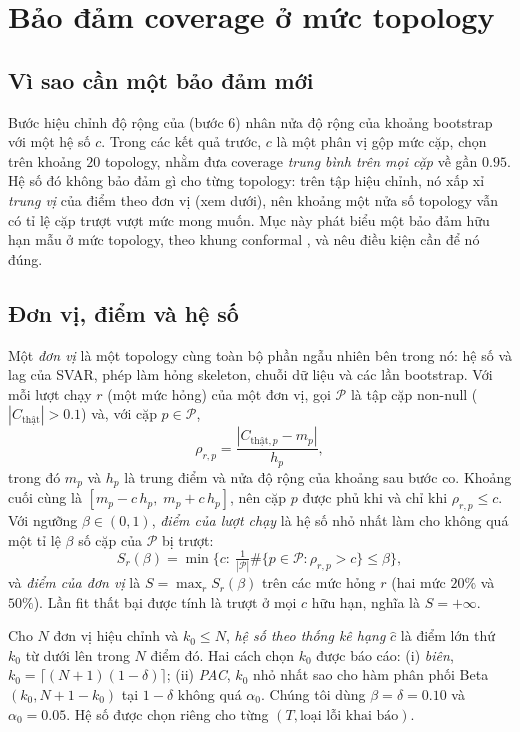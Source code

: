 \section{Bảo đảm coverage ở mức topology}\label{sec:bao-dam}

\subsection{Vì sao cần một bảo đảm mới}
Bước hiệu chỉnh độ rộng của \ours{} (bước 6) nhân nửa độ rộng của khoảng bootstrap với một hệ số $c$. Trong các kết quả trước, $c$ là một phân vị gộp mức cặp, chọn trên khoảng $20$ topology, nhằm đưa coverage \emph{trung bình trên mọi cặp} về gần $0.95$. Hệ số đó không bảo đảm gì cho từng topology: trên tập hiệu chỉnh, nó xấp xỉ \emph{trung vị} của điểm theo đơn vị (xem dưới), nên khoảng một nửa số topology vẫn có tỉ lệ cặp trượt vượt mức mong muốn. Mục này phát biểu một bảo đảm hữu hạn mẫu ở mức topology, theo khung conformal \citep{barber2023conformal,dunn2023distribution}, và nêu điều kiện cần để nó đúng.

\subsection{Đơn vị, điểm và hệ số}
Một \emph{đơn vị} là một topology cùng toàn bộ phần ngẫu nhiên bên trong nó: hệ số và lag của SVAR, phép làm hỏng skeleton, chuỗi dữ liệu và các lần bootstrap. Với mỗi lượt chạy $r$ (một mức hỏng) của một đơn vị, gọi $\mathcal P$ là tập cặp non-null ($|C_{\text{thật}}|>0.1$) và, với cặp $p\in\mathcal P$,
\begin{equation}
\rho_{r,p}=\frac{|C_{\text{thật},p}-m_p|}{h_p},
\end{equation}
trong đó $m_p$ và $h_p$ là trung điểm và nửa độ rộng của khoảng sau bước co. Khoảng cuối cùng là $[m_p-c\,h_p,\;m_p+c\,h_p]$, nên cặp $p$ được phủ khi và chỉ khi $\rho_{r,p}\le c$. Với ngưỡng $\beta\in(0,1)$, \emph{điểm của lượt chạy} là hệ số nhỏ nhất làm cho không quá một tỉ lệ $\beta$ số cặp của $\mathcal P$ bị trượt:
\begin{equation}
S_r(\beta)=\min\{c:\ \tfrac1{|\mathcal P|}\#\{p\in\mathcal P:\rho_{r,p}>c\}\le\beta\},
\end{equation}
và \emph{điểm của đơn vị} là $S=\max_r S_r(\beta)$ trên các mức hỏng $r$ (hai mức $20\%$ và $50\%$). Lần fit thất bại được tính là trượt ở mọi $c$ hữu hạn, nghĩa là $S=+\infty$.

Cho $N$ đơn vị hiệu chỉnh và $k_0\le N$, \emph{hệ số theo thống kê hạng} $\hat c$ là điểm lớn thứ $k_0$ từ dưới lên trong $N$ điểm đó. Hai cách chọn $k_0$ được báo cáo: (i) \emph{biên}, $k_0=\lceil(N+1)(1-\delta)\rceil$; (ii) \emph{PAC}, $k_0$ nhỏ nhất sao cho hàm phân phối Beta$(k_0,N+1-k_0)$ tại $1-\delta$ không quá $\alpha_0$. Chúng tôi dùng $\beta=\delta=0.10$ và $\alpha_0=0.05$. Hệ số được chọn riêng cho từng $(T,\text{loại lỗi khai báo})$.

